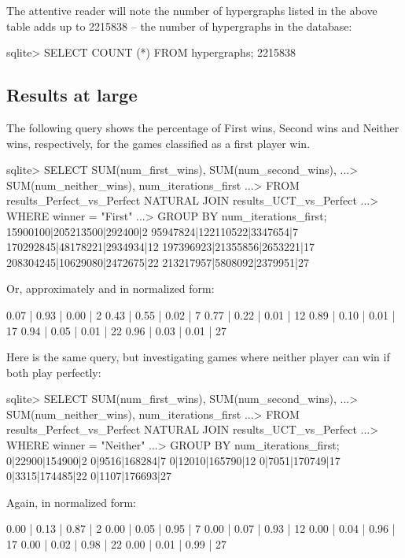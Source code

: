 The attentive reader will note the number of hypergraphs listed in the above table adds up to 2215838 -- the number of hypergraphs in the database:
\begin{code}
sqlite> SELECT COUNT (*) FROM hypergraphs;
2215838
\end{code}

\subsection{Results at large}

The following query shows the percentage of First wins, Second wins and Neither wins, respectively, for the games classified as a first player win.
\begin{code}
sqlite> SELECT SUM(num_first_wins), SUM(num_second_wins),
   ...>        SUM(num_neither_wins), num_iterations_first
   ...> FROM results_Perfect_vs_Perfect NATURAL JOIN results_UCT_vs_Perfect
   ...> WHERE winner = "First"
   ...> GROUP BY num_iterations_first;
15900100|205213500|292400|2
95947824|122110522|3347654|7
170292845|48178221|2934934|12
197396923|21355856|2653221|17
208304245|10629080|2472675|22
213217957|5808092|2379951|27
\end{code}
Or, approximately and in normalized form:
\begin{code}
0.07 | 0.93 | 0.00 | 2
0.43 | 0.55 | 0.02 | 7
0.77 | 0.22 | 0.01 | 12
0.89 | 0.10 | 0.01 | 17
0.94 | 0.05 | 0.01 | 22
0.96 | 0.03 | 0.01 | 27
\end{code}

Here is the same query, but investigating games where neither player can win if both play perfectly:

\begin{code}
sqlite> SELECT SUM(num_first_wins), SUM(num_second_wins),
   ...>        SUM(num_neither_wins), num_iterations_first
   ...> FROM results_Perfect_vs_Perfect NATURAL JOIN results_UCT_vs_Perfect
   ...> WHERE winner = "Neither"
   ...> GROUP BY num_iterations_first;
0|22900|154900|2
0|9516|168284|7
0|12010|165790|12
0|7051|170749|17
0|3315|174485|22
0|1107|176693|27
\end{code}

Again, in normalized form:

\begin{code}
0.00 | 0.13 | 0.87 | 2
0.00 | 0.05 | 0.95 | 7
0.00 | 0.07 | 0.93 | 12
0.00 | 0.04 | 0.96 | 17
0.00 | 0.02 | 0.98 | 22
0.00 | 0.01 | 0.99 | 27
\end{code}

